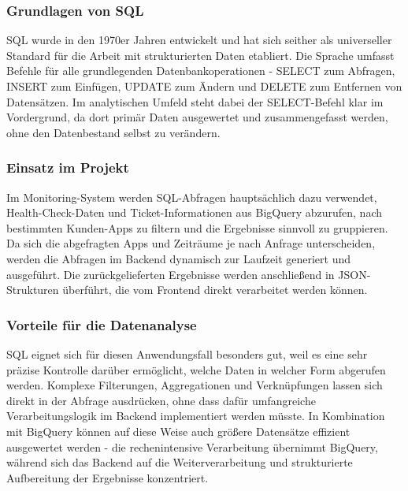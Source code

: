 \subsubsection{Grundlagen von SQL}
SQL wurde in den 1970er Jahren entwickelt und hat sich seither als universeller Standard für die Arbeit mit strukturierten Daten etabliert. Die Sprache umfasst Befehle für alle grundlegenden Datenbankoperationen - SELECT zum Abfragen, INSERT zum Einfügen, UPDATE zum Ändern und DELETE zum Entfernen von Datensätzen. Im analytischen Umfeld steht dabei der SELECT-Befehl klar im Vordergrund, da dort primär Daten ausgewertet und zusammengefasst werden, ohne den Datenbestand selbst zu verändern.

\subsubsection{Einsatz im Projekt}
Im Monitoring-System werden SQL-Abfragen hauptsächlich dazu verwendet, Health-Check-Daten und Ticket-Informationen aus BigQuery abzurufen, nach bestimmten Kunden-Apps zu filtern und die Ergebnisse sinnvoll zu gruppieren. Da sich die abgefragten Apps und Zeiträume je nach Anfrage unterscheiden, werden die Abfragen im Backend dynamisch zur Laufzeit generiert und ausgeführt. Die zurückgelieferten Ergebnisse werden anschließend in JSON-Strukturen überführt, die vom Frontend direkt verarbeitet werden können.

\subsubsection{Vorteile für die Datenanalyse}
SQL eignet sich für diesen Anwendungsfall besonders gut, weil es eine sehr präzise Kontrolle darüber ermöglicht, welche Daten in welcher Form abgerufen werden. Komplexe Filterungen, Aggregationen und Verknüpfungen lassen sich direkt in der Abfrage ausdrücken, ohne dass dafür umfangreiche Verarbeitungslogik im Backend implementiert werden müsste. In Kombination mit BigQuery können auf diese Weise auch größere Datensätze effizient ausgewertet werden - die rechenintensive Verarbeitung übernimmt BigQuery, während sich das Backend auf die Weiterverarbeitung und strukturierte Aufbereitung der Ergebnisse konzentriert.